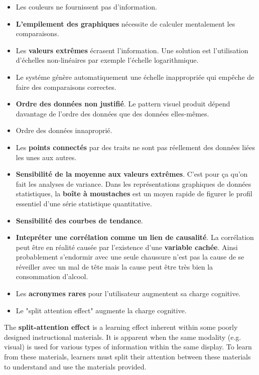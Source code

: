 \begin{itemize}
\item Les couleurs ne fournissent pas d'information.
\item \textbf{L'empilement des graphiques} n\'ecessite de calculer mentalement les comparaisons.
\item Les \textbf{valeurs extr\^emes} \'ecrasent l’information. Une solution est l'utilisation d'\'echelles non-lin\'eaires par exemple l'\'echelle logarithmique.
\item Le syst\'eme g\'en\`ere automatiquement une \'echelle inappropri\'ee qui emp\^eche de faire des comparaisons correctes.
\item \textbf{Ordre des donn\'ees non justifi\'e}. Le pattern visuel produit d\'epend davantage de l’ordre des donn\'ees que des donn\'ees elles-m\^emes.
\item Ordre des donn\'ees innapropri\'e.
\item Les \textbf{points connect\'es} par des traits ne sont pas r\'eellement des donn\'ees li\'ees les unes aux autres.
\item \textbf{Sensibilit\'e de la moyenne aux valeurs extr\^emes}. C'est pour \c{c}a qu'on fait les analyses de variance. Dans les repr\'esentations graphiques de donn\'ees statistiques, la \textbf{bo\^ite \`a moustaches} est un moyen rapide de figurer le profil essentiel d'une s\'erie statistique quantitative.
\item \textbf{Sensibilit\'e des courbes de tendance}.
\item \textbf{Intepr\'eter une corr\'elation comme un lien de causalit\'e}. La corr\'elation peut \^etre en r\'ealit\'e caus\'ee par l'existence d'une \textbf{variable cach\'ee}. Ainsi probablement s'endormir avec une seule chaussure n'est pas la cause de se r\'eveiller avec un mal de t\^ete mais la cause peut \^etre tr\`es bien la consommation d'alcool.
\item Les \textbf{acronymes rares} pour l'utilisateur augmentent sa charge cognitive.
\item Le "split attention effect" augmente la charge cognitive.
\end{itemize}

The \textbf{split-attention effect} is a learning effect inherent within some poorly designed instructional materials. It is apparent when the same modality (e.g. visual) is used for various types of information within the same display. To learn from these materials, learners must split their attention between these materials to understand and use the materials provided.

